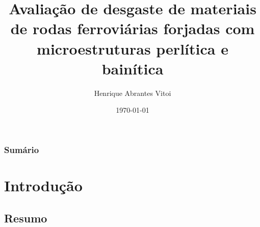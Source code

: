 \documentclass{beamer}
\title[Desgaste de rodas ferroviárias]{Avaliação de desgaste de materiais de rodas ferroviárias forjadas com microestruturas perlítica e bainítica} %
\author{Henrique Abrantes Vitoi} %
\institute[UFJF] %
{
Universidade Federal de Juiz de Fora \\ %
\medskip
\textit{vitoi.henrique@engenharia.ufjf.br} %
}
\date{\today} %
\begin{document}
\begin{frame}
\titlepage %
\end{frame}

\begin{frame}
\frametitle{Sumário} %
{\tiny \tableofcontents} %
\end{frame}


\section{Introdução} %

\subsection{Resumo}
\end{document}
